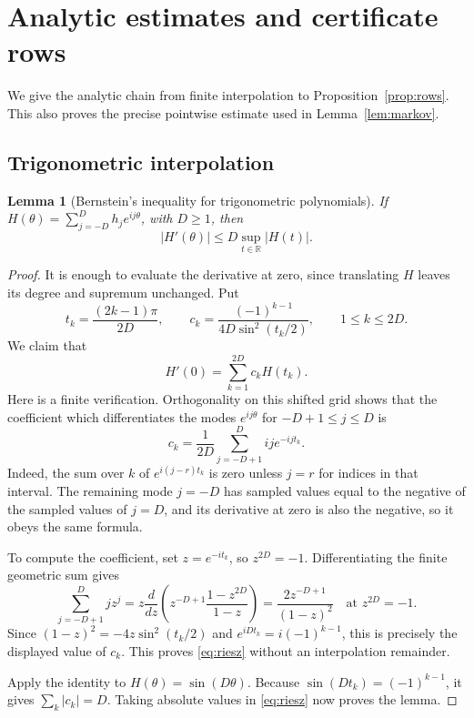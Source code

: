 \documentclass[11pt,reqno]{amsart}
\newtheorem{lemma}[theorem]{Lemma}
\theoremstyle{definition}
\theoremstyle{remark}
\newcommand{\R}{\mathbb R}
\numberwithin{equation}{section}
\begin{document}
\appendix
\section{Analytic estimates and certificate rows}\label{app:analytic}

We give the analytic chain from finite interpolation to
Proposition~\ref{prop:rows}. This also proves the precise pointwise
estimate used in Lemma~\ref{lem:markov}.

\subsection{Trigonometric interpolation}

\begin{lemma}[Bernstein's inequality for trigonometric polynomials]\label{lem:trig}
If $H(\theta)=\sum_{j=-D}^D h_j e^{ij\theta}$, with $D\ge1$, then
\[
 |H'(\theta)|\le D\sup_{t\in\R}|H(t)|.
\]
\end{lemma}

\begin{proof}
It is enough to evaluate the derivative at zero, since translating
$H$ leaves its degree and supremum unchanged. Put
\[
 t_k=\frac{(2k-1)\pi}{2D},\qquad
 c_k=\frac{(-1)^{k-1}}{4D\sin^2(t_k/2)},\qquad 1\le k\le2D.
\]
We claim that
\begin{equation}\label{eq:riesz}
 H'(0)=\sum_{k=1}^{2D}c_k H(t_k).
\end{equation}
Here is a finite verification. Orthogonality on this shifted grid shows
that the coefficient which differentiates the modes
$e^{ij\theta}$ for $-D+1\le j\le D$ is
\[
 c_k=\frac1{2D}\sum_{j=-D+1}^D ij e^{-ijt_k}.
\]
Indeed, the sum over $k$ of $e^{i(j-r)t_k}$ is zero unless $j=r$
for indices in that interval. The remaining mode $j=-D$ has sampled
values equal to the negative of the sampled values of $j=D$, and its
derivative at zero is also the negative, so it obeys the same formula.

To compute the coefficient, set $z=e^{-it_k}$, so $z^{2D}=-1$.
Differentiating the finite geometric sum gives
\[
 \sum_{j=-D+1}^D jz^j
 =z\frac{d}{dz}\left(z^{-D+1}\frac{1-z^{2D}}{1-z}\right)
 =\frac{2z^{-D+1}}{(1-z)^2}
 \quad\text{at }z^{2D}=-1.
\]
Since $(1-z)^2=-4z\sin^2(t_k/2)$ and
$e^{iDt_k}=i(-1)^{k-1}$, this is precisely the displayed value of $c_k$.
This proves \eqref{eq:riesz} without an interpolation remainder.

Apply the identity to $H(\theta)=\sin(D\theta)$.
Because $\sin(Dt_k)=(-1)^{k-1}$, it gives
$\sum_k|c_k|=D$. Taking absolute values in \eqref{eq:riesz}
now proves the lemma.
\end{proof}
\end{document}

